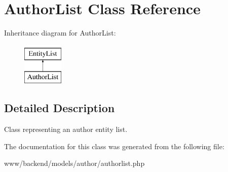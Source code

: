 \hypertarget{classAuthorList}{
\section{AuthorList Class Reference}
\label{classAuthorList}
}
Inheritance diagram for AuthorList:\begin{figure}[H]
\begin{center}
\leavevmode
\includegraphics[height=2.000000cm]{classAuthorList}
\end{center}
\end{figure}


\subsection{Detailed Description}
Class representing an author entity list. 

The documentation for this class was generated from the following file:\begin{DoxyCompactItemize}
\item 
www/backend/models/author/authorlist.php\end{DoxyCompactItemize}
